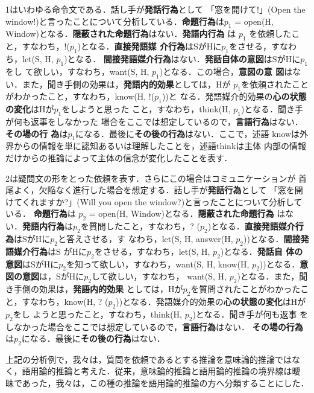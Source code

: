 1はいわゆる命令文である．話し手が{\bf 発話行為}として 「窓を開けて!」(Open the
window!)と言ったことについて分析している．{\bf 命題行為}は$p_{1}$ =
open(H, Window)となる．{\bf 隠蔽された命題行為}はない．{\bf 発語内行為}
は $p_{1}$ を依頼したこと，すなわち，!($p_{1}$)となる．{\bf 直接発語媒
介行為}はSがHに$p_{1}$をさせる，すなわち，let(S, H, $p_{1}$)となる．
{\bf 間接発語媒介行為}はない．{\bf 発話自体の意図}はSがHに$p_{1}$をし
て欲しい，すなわち，want(S, H, $p_{1}$)となる．この場合，{\bf 意図の意
図}はない．また，聞き手側の効果は，{\bf 発語内的効果}としては，Hが
$p_{1}$を依頼されたことがわかったこと，すなわち，know(H, !($p_{1}$))と
なる．発語媒介的効果の{\bf 心の状態の変化}はHが$p_{1}$をしようと思った
こと，すなわち，think(H, $p_{1}$)となる．聞き手が何も返事をしなかった
場合をここでは想定しているので，{\bf 言語行為}はない．{\bf その場の行
為}は$p_{1}$になる．最後に{\bf その後の行為}はない．ここで，述語
knowは外界からの情報を単に認知あるいは理解したことを，述語thinkは主体
内部の情報だけからの推論によって主体の信念が変化したことを表す．

2は疑問文の形をとった依頼を表す．さらにこの場合はコミュニケーションが
首尾よく，欠陥なく進行した場合を想定する．話し手が{\bf 発話行為}として 
「窓を開けてくれますか?」(Will you open the window?)と言ったことについて分析している．{\bf 
命題行為}は $p_{2}$ = open(H, Window)となる．{\bf 隠蔽された命題行為}
はない．{\bf 発語内行為}は$p_{2}$を質問したこと，すなわち，?
($p_{2}$)となる．{\bf 直接発語媒介行為}はSがHに$p_{2}$と答えさせる，す
なわち，let(S, H, answer(H, $p_{2}$))となる．{\bf 間接発語媒介行為}はS
がHに$p_{2}$をさせる，すなわち，let(S, H, $p_{2}$)となる．{\bf 発話自
体の意図}はSがHに$p_{2}$を知って欲しい，すなわち，want(S, H, know(H,
$p_{2}$))となる．{\bf 意図の意図}は，SがHに$p_{2}$して欲しい，すなわち，
want(S, H, $p_{2}$)となる．また，聞き手側の効果は，{\bf 発語内的効果}
としては，Hが$p_{2}$を質問されたことがわかったこと，すなわち，know(H, ?
($p_{2}$))となる．発語媒介的効果の{\bf 心の状態の変化}はHが$p_{2}$をし
ようと思ったこと，すなわち，think(H, $p_{2}$)となる．聞き手が何も返事
をしなかった場合をここでは想定しているので，{\bf 言語行為}はない．{\bf 
その場の行為}は$p_{2}$になる．最後に{\bf その後の行為}はない．

上記の分析例で，我々は，質問を依頼であるとする推論を意味論的推論ではな
く，語用論的推論と考えた．従来，意味論的推論と語用論的推論の境界線は曖
昧であった，我々は，この種の推論を語用論的推論の方へ分類することにした．

